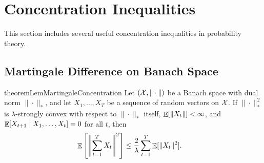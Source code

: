 
\section{Concentration Inequalities}
\label{app:prelim:concentration}

This section includes several useful concentration inequalities in probability theory.

\subsection{Martingale Difference on Banach Space}

\begin{restatable}{theorem}{LemMartingaleConcentration}
\label{thm:concentration:martingale-difference}
Let $({\cal X},\|\cdot\|)$ be a Banach space with dual norm $\|\cdot\|_\ast$, and let $X_1,\ldots,X_T$ be a sequence of random vectors on ${\cal X}$. If $\|\cdot\|_\ast^2$ is $\lambda$-strongly convex with respect to $\|\cdot\|_\ast$ itself, $\mathop{\mathbb{E}}[\|X_t\|]<\infty$, and $\mathop{\mathbb{E}}[X_{t+1}\mid X_1,\ldots,X_t]=0$ for all $t$, then
\begin{align}
    \mathop{\mathbb{E}}\left[ \left\| \sum_{t=1}^T X_t \right\|^2 \right]
    &\le \frac{2}{\lambda}\sum_{t=1}^T\mathop{\mathbb{E}}[\|X_t\|^2].
    \label{eq:concentration:martingale-difference}
\end{align}
\end{restatable}

